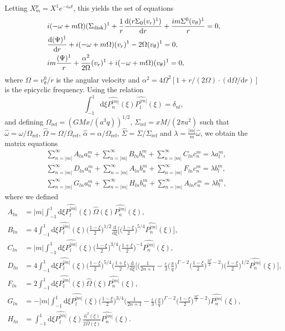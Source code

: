 \documentclass[11pt]{article}
\newcommand{\rd}{\mathrm{d}}
\newcommand{\vr}{v_{r}}
\newcommand{\vt}{v_{\theta}}
\newcommand{\Sigmad}{\Sigma_{\rm{disk}}}
\newcommand{\anm}{a_n^m}
\newcommand{\bnm}{b_n^m}
\newcommand{\cnm}{c_n^m}
\newcommand{\alm}{a_l^m}
\newcommand{\blm}{b_l^m}
\newcommand{\Pnm}{P_n^{|m|}}
\newcommand{\Plm}{P_l^{|m|}}
\newcommand{\hPnm}{\widehat{\Pnm}}
\newcommand{\hPlm}{\widehat{\Plm}}
\newcommand{\homega}{\widehat{\omega}}
\newcommand{\hOmega}{\widehat{\Omega}}
\newcommand{\Omegaref}{\Omega_{\mathrm{ref}}}
\newcommand{\halpha}{\widehat{\alpha}}
\newcommand{\Sigmaref}{\Sigma_{\mathrm{ref}}}
\newcommand{\hSigma}{\widehat{\Sigma}}
\begin{document}
Letting $X_m^p = X^1  e^{-i \omega t}$, this yields the set of equations
\begin{align}
&i(-\omega + m \Omega)(\Sigmad)^1 + \frac{1}{r} \frac{\rd (r\Sigma_0 (\vr)^1)}{\rd r} + \frac{im\Sigma^0 (\vt)^1}{r} = 0,\\
&\frac{\rd (\Psi)^1}{\rd r} + i(-\omega + m \Omega)(\vr)^1 - 2 \Omega (\vt)^1 = 0,\\
&i m \frac{(\Psi)^1}{r} + \frac{\alpha^2}{2\Omega} (\vr)^1 + i(-\omega + m \Omega)(\vt)^1 = 0,
\end{align}
where $\Omega = \vt^0/r$ is the angular velocity and $\alpha^2=4\Omega^2[1+r/(2\Omega)\cdot(\rd \Omega /\rd r)]$ is the epicyclic frequency. Using the relation 
$$\int_{-1}^{1} \rd \xi \hPnm(\xi)\hPlm(\xi) = \delta_{nl},$$
and defining $\Omegaref=(GMx/(a^3 q))^{1/2}$, $\Sigmaref=xM/(2\pi a^2)$   such that $\homega = \omega/\Omegaref$, $\hOmega = \Omega/\Omegaref$, $\halpha = \alpha/\Omegaref$, $\hSigma=\Sigma/\Sigmaref$ and $\lambda=\frac{|m|}{m}\homega$, we obtain the matrix equations
\begin{align*}
&\sum_{n=|m|}^{\infty}  A_{ln} \anm  +\sum_{n=|m|}^{\infty}  B_{ln}\bnm+\sum_{n=|m|}^{\infty}  C_{ln}\cnm= \lambda \alm ,\\
&\sum_{n=|m|}^{\infty}D_{ln}\anm + \sum_{n=|m|}^{\infty}   A_{ln} \bnm+  \sum_{n=|m|}^{\infty} F_{ln} \cnm  = \lambda   \blm ,\\
&\sum_{n=|m|}^{\infty}G_{ln}\anm + \sum_{n=|m|}^{\infty}   H_{ln} \bnm+  \sum_{n=|m|}^{\infty} A_{ln} \cnm  = \lambda   \blm ,
 \end{align*}
where we defined
\begin{align*}
A_{ln} &= |m| \int_{-1}^{1} \rd \xi  \hPlm(\xi)\hOmega(\xi)\hPnm(\xi) , \\
B_{ln} &= 4 \int_{-1}^{1} \rd \xi  \hPlm(\xi) \bigg(\frac{1-\xi}{2}\bigg)^{1/2} \frac{\rd}{\rd \xi} \bigg[\bigg(\frac{1-\xi}{2}\bigg)^{5/4}\hPnm(\xi)\bigg], \\
C_{ln} &= |m| \int_{-1}^{1} \rd \xi \hPlm(\xi) \bigg(\frac{1-\xi}{2}\bigg)^{3/4}\bigg(\frac{1+\xi}{2}\bigg)^{-1}   \hPnm(\xi), \\
D_{ln} &= 4 \int_{-1}^{1} \rd \xi \hPlm(\xi)  \bigg(\frac{1-\xi}{2}\bigg)^{5/4} \bigg(\frac{1+\xi}{2}\bigg) 
\frac{\rd}{\rd \xi} \bigg[\bigg(\frac{1}{2n+1}-\frac{\varepsilon}{3}  \bigg(\frac{x}{q}\bigg)^{\Gamma-2} \bigg(\frac{1-\xi}{2}\bigg)^{\frac{3\Gamma}{2}-2}\bigg) \bigg(\frac{1-\xi}{2}\bigg)^{1/2}\hPnm(\xi) \bigg] ,\\
F_{ln} &=2 \int_{-1}^{1} \rd \xi  \hPlm(\xi)\hOmega(\xi)\hPnm(\xi) , \\
G_{ln} &= -|m| \int_{-1}^{1} \rd \xi \hPlm(\xi)  \bigg(\frac{1-\xi}{2}\bigg)^{3/4} 
\bigg(\frac{1}{2n+1}-\frac{\varepsilon}{3}  \bigg(\frac{x}{q}\bigg)^{\Gamma-2} \bigg(\frac{1-\xi}{2}\bigg)^{\frac{3\Gamma}{2}-2}\bigg) \hPnm(\xi)  ,\\
H_{ln} &=  \int_{-1}^{1} \rd \xi  \hPlm(\xi)\frac{\halpha^2(\xi)}{2\hOmega(\xi)}\hPnm(\xi) .
\end{align*}
\end{document}
